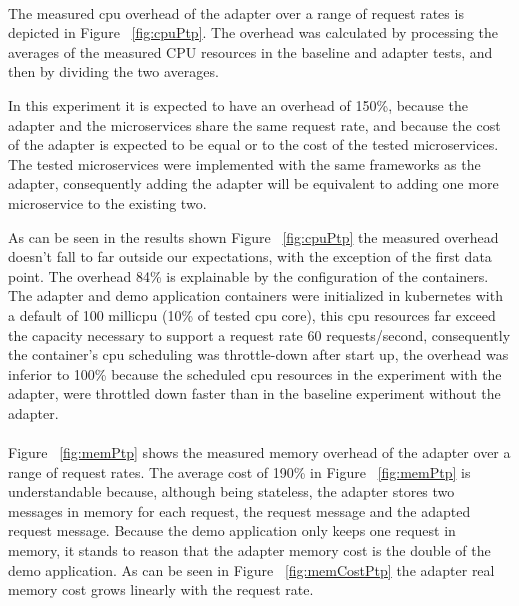 \paragraph{}

The measured cpu overhead of the adapter over a
range of request rates is depicted in Figure ~\ref{fig:cpuPtp}.
The overhead was calculated by processing the averages of the measured CPU resources in the baseline and adapter tests, and then by dividing the two averages.

In this experiment it is expected to have an overhead of 150\%, because the adapter and the microservices share the same request rate,
and because the cost of the adapter is expected to be equal or to the cost of the tested microservices.
The tested microservices were implemented with the same frameworks as the adapter, consequently adding the adapter will be equivalent to adding one more microservice to the existing two.

As can be seen in the results shown Figure ~\ref{fig:cpuPtp} the measured overhead doesn't fall to far outside our expectations, with the exception of the first data point.
The overhead 84\% is explainable by the configuration of the containers.
The adapter and demo application containers were initialized in kubernetes with a default of 100 millicpu (10\% of tested cpu core),
this cpu resources far exceed the capacity necessary to support a request rate 60 requests/second,
consequently the container's cpu scheduling was throttle-down after start up,
the overhead was inferior to 100\% because the scheduled cpu resources in the experiment with the adapter, were throttled down faster than in the baseline experiment without the adapter.

\paragraph{}

Figure ~\ref{fig:memPtp} shows the measured memory overhead of the adapter over a
range of request rates.
The average cost of 190\% in Figure ~\ref{fig:memPtp} is understandable because, although being stateless, the adapter stores two messages in memory for each request, the request message and the adapted request message.
Because the demo application only keeps one request in memory, it stands to reason that the adapter memory cost is the double of the demo application.
As can be seen in Figure ~\ref{fig:memCostPtp} the adapter real memory cost grows linearly with the request rate.


